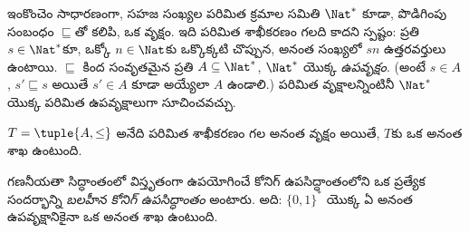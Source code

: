 \documentclass[../../../include/open-logic-section]{subfiles}
\begin{document}
\begin{ex}
ఇంకొంచెం సాధారణంగా, సహజ సంఖ్యల పరిమిత క్రమాల సమితి $\Nat^*$ కూడా,
పొడిగింపు సంబంధం $\sqsubseteq$తో కలిపి, ఒక వృక్షం.
ఇది పరిమిత శాఖీకరణం గలది కాదని స్పష్టం: ప్రతి $s \in \Nat^*$కూ,
ఒక్కో $n \in \Nat$కు ఒక్కొక్కటి చొప్పున, అనంత సంఖ్యలో $sn$ ఉత్తరవర్తులు ఉంటాయి.
$\sqsubseteq$ కింద సంవృతమైన ప్రతి $A \subseteq \Nat^*$,
$\Nat^*$ యొక్క \emph{ఉపవృక్షం}.
(అంటే $s \in A$, $s' \sqsubseteq s$ అయితే $s' \in A$ కూడా అయ్యేలా
$A$ ఉండాలి.) పరిమిత వృక్షాలన్నింటినీ $\Nat^*$ యొక్క పరిమిత
ఉపవృక్షాలుగా సూచించవచ్చు.
\end{ex}

\begin{prop}[కోనిగ్ ఉపసిద్ధాంతం]
$T = \tuple{A,\le}$ అనేది పరిమిత శాఖీకరణం గల అనంత వృక్షం అయితే,
$T$కు ఒక అనంత శాఖ ఉంటుంది.
\end{prop}

గణనీయతా సిద్ధాంతంలో విస్తృతంగా ఉపయోగించే కోనిగ్ ఉపసిద్ధాంతంలోని
ఒక ప్రత్యేక సందర్భాన్ని \emph{బలహీన కోనిగ్ ఉపసిద్ధాంతం} అంటారు.
అది: $\{0,1\}^*$ యొక్క ఏ అనంత ఉపవృక్షానికైనా ఒక అనంత శాఖ ఉంటుంది.
\end{document}
